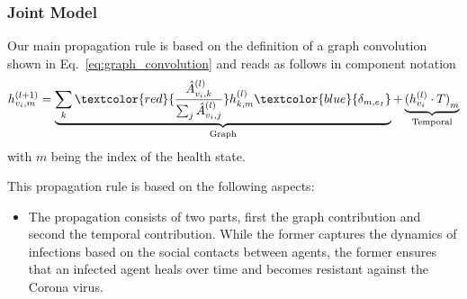 \subsubsection{Joint Model}

Our main propagation rule is based on the definition of a graph convolution shown in Eq.~\eqref{eq:graph_convolution} and reads as follows in component notation
\begin{equation}
h_{v_i, m}^{(l+1)}
=
\underbrace{
	\sum_k \textcolor{red}{\frac{\hat{A}_{v_i, k}^{(l)}}{\sum_j \hat{A}_{v_i, j}^{(l)}}} h_{k, m}^{(l)} \textcolor{blue}{\delta_{m, e_I}}
}_{\text{Graph}}
+
\underbrace{
	{(h_{v_i}^{(l)}\cdot T)}_m
}_{\text{Temporal}}
\end{equation}
with $m$ being the index of the health state.

This propagation rule is based on the following aspects:

\begin{itemize}
	\item The propagation consists of two parts, first the graph contribution and second the temporal contribution. While the former captures the dynamics of infections based on the social contacts between agents, the former ensures that an infected agent heals over time and becomes resistant against the Corona virus.
\end{itemize}